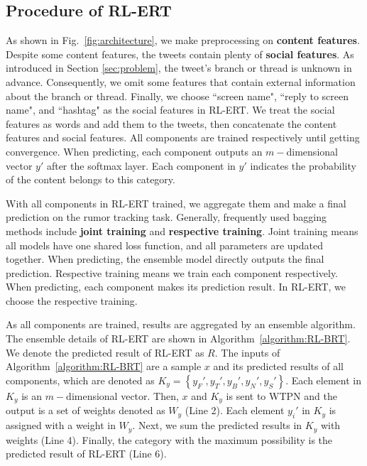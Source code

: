 \documentclass[review]{elsarticle}
\begin{document}
\subsection{Procedure of RL-ERT}
As shown in Fig.~\ref{fig:architecture}, we make preprocessing on \textbf{content features}. Despite some content features, the tweets contain plenty of \textbf{social features}. As introduced in Section \ref{sec:problem}, the tweet's branch or thread is unknown in advance. Consequently, we omit some features that contain external information about the branch or thread. Finally, we choose ``screen name", ``reply to screen name", and ``hashtag" as the social features in RL-ERT. We treat the social features as words and add them to the tweets, then concatenate the content features and social features. All components are trained respectively until getting convergence. When predicting, each component outputs an $m-$dimensional vector $y'$ after the softmax layer. Each component in $y'$ indicates the probability of the content belongs to this category. 

With all components in RL-ERT trained, we aggregate them and make a final prediction on the rumor tracking task. Generally, frequently used bagging methods include \textbf{joint training} and \textbf{respective training}. Joint training means all models have one shared loss function, and all parameters are updated together. When predicting, the ensemble model directly outputs the final prediction. Respective training means we train each component respectively. When predicting, each component makes its prediction result. In RL-ERT, we choose the respective training. 

As all components are trained, results are aggregated by an ensemble algorithm. The ensemble details of RL-ERT are shown in Algorithm~\ref{algorithm:RL-BRT}. We denote the predicted result of RL-ERT as $R$. The inputs of Algorithm~\ref{algorithm:RL-BRT} are a sample $x$ and its predicted results of all components, which are denoted as $K_y = \left\{y_F', y_T', y_B', y_N', y_S' \right\}$. Each element in $K_y$ is an $m-$dimensional vector. Then, $x$ and $K_y$ is sent to WTPN and the output is a set of weights denoted as $W_y$ (Line 2). Each element $y_i'$ in $K_y$ is assigned with a weight in $W_y$. Next, we sum the predicted results in $K_y$ with weights (Line 4). Finally, the category with the maximum possibility is the predicted result of RL-ERT (Line 6). 
\end{document}
